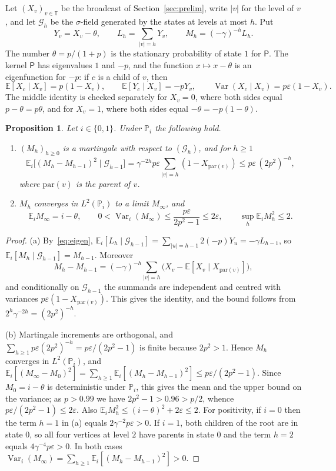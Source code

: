 \documentclass{amsart}
\newtheorem{proposition}[theorem]{Proposition}
\theoremstyle{definition}
\theoremstyle{remark}
\numberwithin{equation}{section}
\newcommand{\eps}{\varepsilon}
\newcommand{\E}{\mathbb{E}}
\newcommand{\Prob}{\mathbb{P}}
\newcommand{\Tb}{\mathbb{T}}
\newcommand{\Var}{\operatorname{Var}}
\newcommand{\abs}[1]{\lvert #1\rvert}
\begin{document}
Let $(X_v)_{v\in\Tb}$ be the broadcast of Section~\ref{sec:prelim}, write $\abs v$ for the level of $v$, and let $\mathcal G_h$ be the $\sigma$-field generated by the states at levels at most $h$. Put
\[
Y_v=X_v-\theta,\qquad L_h=\sum_{\abs v=h}Y_v,\qquad M_h=(-\gamma)^{-h}L_h .
\]
The number $\theta=p/(1+p)$ is the stationary probability of state $1$ for $\mathsf P$. The kernel $\mathsf P$ has eigenvalues $1$ and $-p$, and the function $x\mapsto x-\theta$ is an eigenfunction for $-p$: if $c$ is a child of $v$, then
\begin{equation}\label{eq:eigen}
\E[X_c\mid X_v]=p(1-X_v),\qquad \E[Y_c\mid X_v]=-pY_v,\qquad \Var(X_c\mid X_v)=p\eps(1-X_v).
\end{equation}
The middle identity is checked separately for $X_v=0$, where both sides equal $p-\theta=p\theta$, and for $X_v=1$, where both sides equal $-\theta=-p(1-\theta)$.

\begin{proposition}\label{prop:martingale}
Let $i\in\{0,1\}$. Under $\Prob_i$ the following hold.
\begin{enumerate}[label=\textup{(\alph*)},leftmargin=*]
\item $(M_h)_{h\ge0}$ is a martingale with respect to $(\mathcal G_h)$, and for $h\ge1$
\[
\E_i\bigl[(M_h-M_{h-1})^2\mid\mathcal G_{h-1}\bigr]=\gamma^{-2h}p\eps\sum_{\abs v=h}(1-X_{\mathrm{par}(v)})\le p\eps\,(2p^2)^{-h},
\]
where $\mathrm{par}(v)$ is the parent of $v$.
\item $M_h$ converges in $L^2(\Prob_i)$ to a limit $M_\infty$, and
\[
\E_iM_\infty=i-\theta,\qquad 0<\Var_i(M_\infty)\le\frac{p\eps}{2p^2-1}\le2\eps,\qquad \sup_{h}\E_iM_h^2\le2 .
\]
\end{enumerate}
\end{proposition}

\begin{proof}
(a) By~\eqref{eq:eigen}, $\E_i[L_h\mid\mathcal G_{h-1}]=\sum_{\abs u=h-1}2(-p)Y_u=-\gamma L_{h-1}$, so $\E_i[M_h\mid\mathcal G_{h-1}]=M_{h-1}$. Moreover
\[
M_h-M_{h-1}=(-\gamma)^{-h}\sum_{\abs v=h}\bigl(X_v-\E[X_v\mid X_{\mathrm{par}(v)}]\bigr),
\]
and conditionally on $\mathcal G_{h-1}$ the summands are independent and centred with variances $p\eps(1-X_{\mathrm{par}(v)})$. This gives the identity, and the bound follows from $2^h\gamma^{-2h}=(2p^2)^{-h}$.

(b) Martingale increments are orthogonal, and $\sum_{h\ge1}p\eps(2p^2)^{-h}=p\eps/(2p^2-1)$ is finite because $2p^2>1$. Hence $M_h$ converges in $L^2(\Prob_i)$, and $\E_i[(M_\infty-M_0)^2]=\sum_{h\ge1}\E_i[(M_h-M_{h-1})^2]\le p\eps/(2p^2-1)$. Since $M_0=i-\theta$ is deterministic under $\Prob_i$, this gives the mean and the upper bound on the variance; as $p>0.99$ we have $2p^2-1>0.96>p/2$, whence $p\eps/(2p^2-1)\le2\eps$. Also $\E_iM_h^2\le(i-\theta)^2+2\eps\le2$. For positivity, if $i=0$ then the term $h=1$ in (a) equals $2\gamma^{-2}p\eps>0$. If $i=1$, both children of the root are in state $0$, so all four vertices at level $2$ have parents in state $0$ and the term $h=2$ equals $4\gamma^{-4}p\eps>0$. In both cases $\Var_i(M_\infty)=\sum_{h\ge1}\E_i[(M_h-M_{h-1})^2]>0$.
\end{proof}
\end{document}
